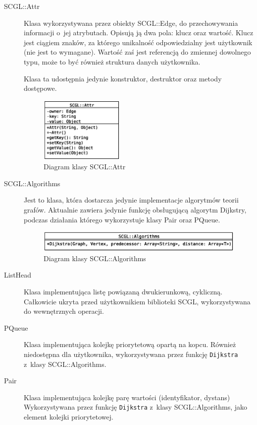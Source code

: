\documentclass[a4paper,12pt,polish,twoside,openright]{thesis}
\newcommand\code[1]{\lstinline[style=line]{#1}}
\begin{document}
\begin{description}
	\item[SCGL::Attr]
	Klasa wykorzystywana przez obiekty SCGL::Edge, do przechowywania informacji o~jej atrybutach.
	Opisują ją dwa pola: klucz oraz wartość.
	Klucz jest ciągiem znaków, za którego unikalność odpowiedzialny jest użytkownik (nie jest to wymagane).
	Wartość zaś jest referencją do zmiennej dowolnego typu, może to być również struktura danych użytkownika.
	
	Klasa ta udostępnia jedynie konstruktor, destruktor oraz metody dostępowe.
	\begin{figure}[htb]
	\begin{center}
		\includegraphics[width=0.4\textwidth]{gfx/class_attr.eps}
		\caption{Diagram klasy SCGL::Attr}
	\end{center}
	\end{figure}

	\item[SCGL::Algorithms]
	Jest to klasa, która dostarcza jedynie implementacje algorytmów teorii grafów.
	Aktualnie zawiera jedynie funkcję obsługującą algorytm Dijkstry, podczas działania którego wykorzystuje klasy Pair oraz PQueue.
	\begin{figure}[htb]
	\begin{center}
		\includegraphics[width=1.0\textwidth]{gfx/class_algo.eps}
		\caption{Diagram klasy SCGL::Algorithms}
	\end{center}
	\end{figure}

	\item[ListHead]
	Klasa implementująca listę powiązaną dwukierunkową, cykliczną.
	Całkowicie ukryta przed użytkownikiem biblioteki SCGL, wykorzystywana do wewnętrznych operacji.

	\item[PQueue]
	Klasa implementująca kolejkę priorytetową opartą na kopcu.
	Również niedostępna dla użytkownika, wykorzystywana przez funkcję \code{Dijkstra} z~klasy SCGL::Algorithms.

	\item[Pair]
	Klasa implementująca kolejkę parę wartości (identyfikator, dystans)
	Wykorzystywana przez funkcję \code{Dijkstra} z~klasy SCGL::Algorithms, jako element kolejki priorytetowej.
\end{description}
\end{document}
